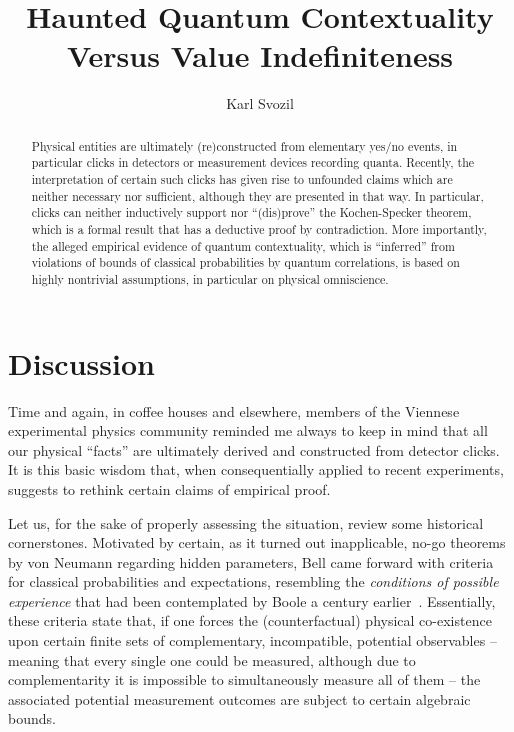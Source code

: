\documentclass[runningheads]{llncs}
\begin{document}
\title{Haunted Quantum Contextuality Versus Value Indefiniteness}


\author{Karl Svozil}

\maketitle


\begin{abstract}
Physical entities are ultimately (re)constructed from elementary yes/no events, in particular clicks in detectors or measurement devices recording quanta. Recently, the interpretation of certain such clicks has given rise to unfounded claims which are neither necessary nor sufficient, although they are presented in that way. In particular, clicks can neither inductively support nor ``(dis)prove'' the Kochen-Specker theorem, which is a formal result that has a deductive proof by contradiction. More importantly, the alleged empirical evidence of quantum contextuality, which is ``inferred'' from violations of bounds of classical probabilities by quantum correlations, is based on highly nontrivial assumptions, in particular on physical omniscience.
\end{abstract}



\section*{Discussion}

Time and again, in coffee houses and elsewhere,
members of the Viennese experimental physics community reminded me
always to keep in mind that all our physical ``facts''
are ultimately derived and constructed from detector clicks.
It is this basic wisdom that, when consequentially applied to recent experiments,
suggests to rethink certain claims of empirical proof.

Let us, for the sake of properly assessing the situation,
review some historical cornerstones.
Motivated by certain, as it turned out inapplicable,
no-go theorems by von Neumann regarding hidden parameters,
Bell came forward with criteria for classical probabilities and expectations,
resembling the {\em conditions of possible experience} that
had been contemplated by Boole a century earlier~\cite{Pit-94}.
Essentially, these criteria state that,
if one forces the (counterfactual) physical co-existence
upon certain finite sets of complementary, incompatible, potential observables
--
meaning that every single one could be measured,
although due to complementarity
it is impossible to simultaneously measure all of them
--
the associated potential measurement outcomes are
subject to certain algebraic bounds.
\end{document}
